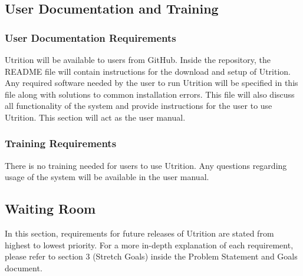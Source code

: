 \documentclass[12pt]{article}
\begin{document}
\subsection{User Documentation and Training}
\subsubsection{User Documentation Requirements}
Utrition will be available to users from GitHub. Inside the repository, the README file will contain instructions for the download and setup of Utrition. Any required software needed by the user to run Utrition will be specified in this file along with solutions to common installation errors. This file will also discuss all functionality of the system and provide instructions for the user to use Utrition. This section will act as the user manual. 

\subsubsection{Training Requirements}
There is no training needed for users to use Utrition. Any questions regarding usage of the system will be available in the user manual.

\subsection{Waiting Room}
In this section, requirements for future releases of Utrition are stated from highest to lowest priority. For a more in-depth explanation of each requirement, please refer to section 3 (Stretch Goals) inside the Problem Statement and Goals document.
\end{document}
